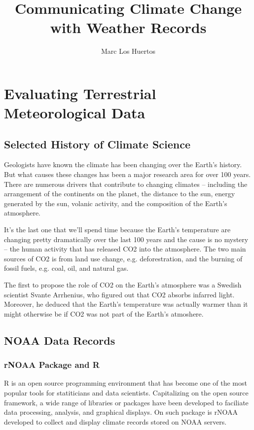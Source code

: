 \documentclass{article}\usepackage[]{graphicx}\usepackage[]{color}
\title{Communicating Climate Change with Weather Records}
\author{Marc Los Huertos}
\begin{document}
\maketitle

\section{Evaluating Terrestrial Meteorological Data}

\subsection{Selected History of Climate Science}

Geologists have known the climate has been changing over the Earth's history. But what causes these changes has been a major research area for over 100 years. There are numerous drivers that contribute to changing climates -- including the arrangement of the continents on the planet, the distance to the sun, energy generated by the sun, volanic activity, and the composition of the Earth's atmosphere. 

It's the last one that we'll spend time because the Earth's temperature are changing pretty dramatically over the last 100 years and the cause is no mystery -- the human activity that has released CO2 into the atmosphere. The two main sources of CO2 is from land use change, e.g. deforestration, and the burning of fossil fuels, e.g. coal, oil, and natural gas. 

The first to propose the role of CO2 on the Earth's atmosphere was a Swedish scientist Svante Arrhenius, who figured out that CO2 absorbs infarred light. Moreover, he deduced that the Earth's temperature was actually warmer than it might otherwise be if CO2 was not part of the Earth's atmoshere. 


\subsection{NOAA Data Records}


\subsubsection{rNOAA Package and R}

R is an open source programming environment that has become one of the most popular tools for statiticians and data scientists. Capitalizing on the open source framework, a wide range of libraries or packages have been developed to faciliate data processing, analysis, and graphical displays. On such package is rNOAA developed to collect and display climate records stored on NOAA servers.
\end{document}
